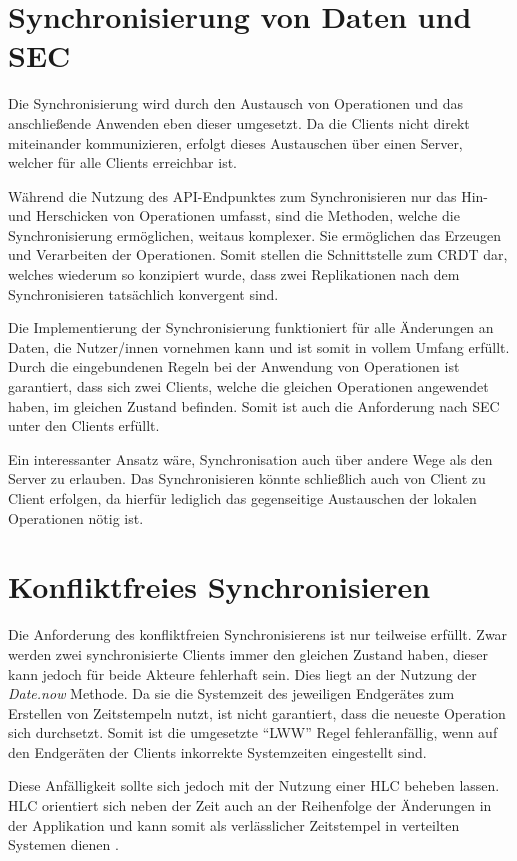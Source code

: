 \documentclass[a4paper, 12pt]{scrreprt}
\begin{document}
\section{Synchronisierung von Daten und SEC}

Die Synchronisierung wird durch den Austausch von Operationen und das anschließende Anwenden eben dieser umgesetzt. Da die Clients nicht direkt miteinander kommunizieren, erfolgt dieses Austauschen über einen Server, welcher für alle Clients erreichbar ist. 

Während die Nutzung des API-Endpunktes zum Synchronisieren nur das Hin- und Herschicken von Operationen umfasst, sind die Methoden, welche die Synchronisierung ermöglichen, weitaus komplexer. Sie ermöglichen das Erzeugen und Verarbeiten der Operationen. Somit stellen die Schnittstelle zum CRDT dar, welches wiederum so konzipiert wurde, dass zwei Replikationen nach dem Synchronisieren tatsächlich konvergent sind.

Die Implementierung der Synchronisierung funktioniert für alle Änderungen an Daten, die Nutzer/innen vornehmen kann und ist somit in vollem Umfang erfüllt. Durch die eingebundenen Regeln bei der Anwendung von Operationen ist garantiert, dass sich zwei Clients, welche die gleichen Operationen angewendet haben, im gleichen Zustand befinden. Somit ist auch die Anforderung nach \ac{SEC} unter den Clients erfüllt. 

Ein interessanter Ansatz wäre, Synchronisation auch über andere Wege als den Server zu erlauben. Das Synchronisieren könnte schließlich auch von Client zu Client erfolgen, da hierfür lediglich das gegenseitige Austauschen der lokalen Operationen nötig ist.

\section{Konfliktfreies Synchronisieren}
Die Anforderung des konfliktfreien Synchronisierens ist nur teilweise erfüllt. Zwar werden zwei synchronisierte Clients immer den gleichen Zustand haben, dieser kann jedoch für beide Akteure fehlerhaft sein. Dies liegt an der Nutzung der \textit{Date.now} Methode. Da sie die Systemzeit des jeweiligen Endgerätes zum Erstellen von Zeitstempeln nutzt, ist nicht garantiert, dass die neueste Operation sich durchsetzt. Somit ist die umgesetzte \enquote{LWW} Regel fehleranfällig, wenn auf den Endgeräten der Clients inkorrekte Systemzeiten eingestellt sind.

Diese Anfälligkeit sollte sich jedoch mit der Nutzung einer \ac{HLC} beheben lassen. \ac{HLC} orientiert sich neben der Zeit auch an der Reihenfolge der Änderungen in der Applikation und kann somit als verlässlicher Zeitstempel in verteilten Systemen dienen \autocite[S. 1]{InproceedingsHLC}. 
\end{document}
